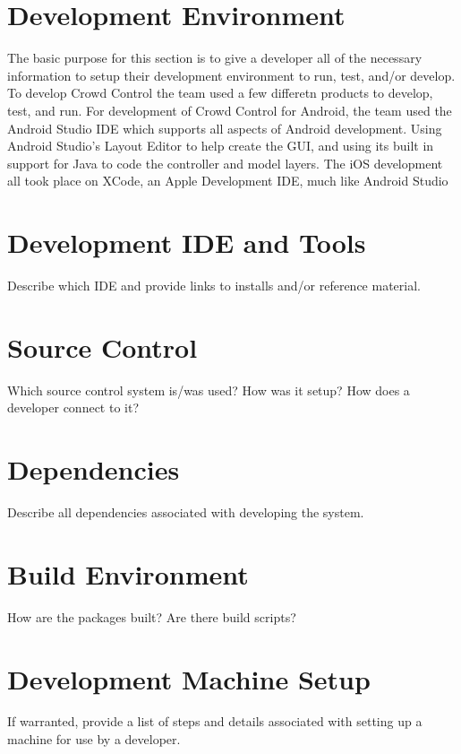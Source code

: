 \section{Development Environment}
The basic purpose for this section is to give a developer all of the necessary 
information to setup their development environment to run, test, and/or develop. 
To develop Crowd Control the team used a few differetn products to develop, test, and run.  For development of Crowd Control for Android, the team used the Android Studio IDE which supports all aspects of Android development.  Using Android Studio's Layout Editor to help create the GUI, and using its built in support for Java to code the controller and model layers.  The iOS development all took place on XCode, an Apple Development IDE, much like Android Studio

\section{Development IDE and Tools}
Describe which IDE and provide links to installs and/or reference material. 

\section{Source  Control}
Which source control system is/was used?  How was it setup?  How does a developer 
connect to it? 

\section{Dependencies}
Describe all dependencies associated with developing the system. 

\section{Build  Environment}
How are the packages built?  Are there build scripts? 

\section{Development Machine Setup}
If warranted, provide a list of steps and details associated with setting up a 
machine for use by a developer. 


